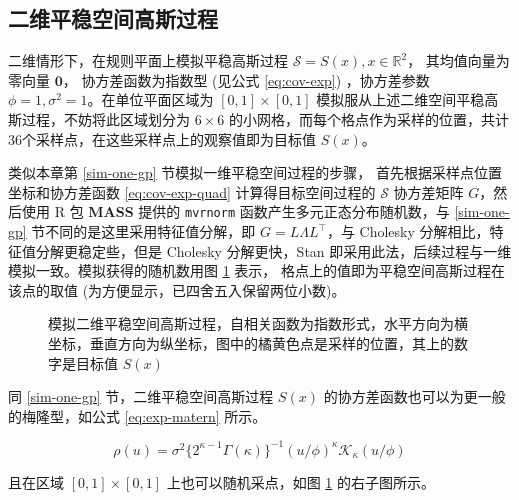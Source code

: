 \documentclass[12pt,a4paper,UTF8,twoside]{book}
\theoremstyle{definition}
\theoremstyle{definition}
\theoremstyle{definition}
\theoremstyle{remark}
\begin{document}
\hypertarget{sim-two-gp}{%
\subsection{二维平稳空间高斯过程}\label{sim-two-gp}}

二维情形下，在规则平面上模拟平稳高斯过程
\(\mathcal{S} = S(x), x \in \mathbb{R}^2\)， 其均值向量为零向量
\(\mathbf{0}\)， 协方差函数为指数型 (见公式 \eqref{eq:cov-exp})
，协方差参数 \(\phi = 1, \sigma^2 = 1\)。在单位平面区域为
\([0,1] \times [0,1]\)
模拟服从上述二维空间平稳高斯过程，不妨将此区域划分为 \(6 \times 6\)
的小网格，而每个格点作为采样的位置，共计
36个采样点，在这些采样点上的观察值即为目标值 \(S(x)\)。

类似本章第 \ref{sim-one-gp} 节模拟一维平稳空间过程的步骤，
首先根据采样点位置坐标和协方差函数 \eqref{eq:cov-exp-quad}
计算得目标空间过程的 \(\mathcal{S}\) 协方差矩阵 \(G\)，然后使用 R 包
\textbf{MASS} 提供的 \texttt{mvrnorm} 函数产生多元正态分布随机数，与
\ref{sim-one-gp} 节不同的是这里采用特征值分解，即
\(G = L\Lambda L^{\top}\)，与 Cholesky
分解相比，特征值分解更稳定些，但是 Cholesky 分解更快，Stan
即采用此法，后续过程与一维模拟一致。模拟获得的随机数用图
\ref{fig:sim-two-gp} 表示， 格点上的值即为平稳空间高斯过程在该点的取值
(为方便显示，已四舍五入保留两位小数)。

\begin{figure}

{\centering {}

}

\caption{模拟二维平稳空间高斯过程，自相关函数为指数形式，水平方向为横坐标，垂直方向为纵坐标，图中的橘黄色点是采样的位置，其上的数字是目标值 $S(x)$}\label{fig:sim-two-gp}
\end{figure}

同 \ref{sim-one-gp} 节，二维平稳空间高斯过程 \(S(x)\)
的协方差函数也可以为更一般的梅隆型，如公式 \eqref{eq:exp-matern} 所示。

\begin{equation}
\rho(u) = \sigma^2 \{ 2^{\kappa -1} \Gamma(\kappa) \}^{-1}( u/\phi )^{\kappa} \mathcal{K}_{\kappa}( u / \phi ) \label{eq:exp-matern}
\end{equation}

\noindent 且在区域 \([0,1] \times [0,1]\) 上也可以随机采点，如图
\ref{fig:sim-two-gp} 的右子图所示。
\end{document}
